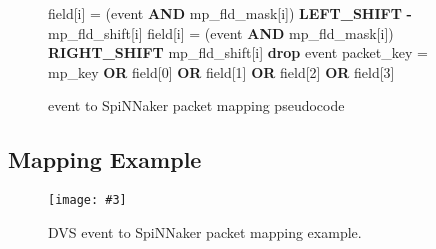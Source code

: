 \documentclass[11pt,a4paper,twoside]{article}
\newcommand{\image}[5][]
{
\begin{figure}[#2]
   \begin{center}
      \texttt{[image: \#3]}
      \caption{#5}
      \label{fig:#4}
   \end{center}
\end{figure}
}
\begin{document}
\begin{figure}[!ht]
	\centering
	\begin{minipage}{0.95\columnwidth}
		\begin{algorithm}[H]
			\caption{event to SpiNNaker packet mapping pseudocode}
			\begin{algorithmic}[1]
					    \State field[i] = (event \textbf{AND} mp\_fld\_mask[i]) \textbf{LEFT\_SHIFT} \textbf{-}mp\_fld\_shift[i]
				    \Else
					    \State field[i] = (event \textbf{AND} mp\_fld\_mask[i]) \textbf{RIGHT\_SHIFT} mp\_fld\_shift[i]
					\EndIf
						\State \textbf{drop} event
				    \EndIf
				\EndFor
					\State packet\_key = mp\_key \textbf{OR} field[0] \textbf{OR} field[1] \textbf{OR} field[2] \textbf{OR} field[3]
			    \EndIf
			\end{algorithmic}
			\label{alg:mapper}
		\end{algorithm}
	\end{minipage}
\end{figure}


\clearpage
\subsection{Mapping Example}


\image[width = 0.9 \textwidth]{!h}{mapper_ex}{fig:maper_fig}
{DVS event to SpiNNaker packet mapping example.}
\end{document}
